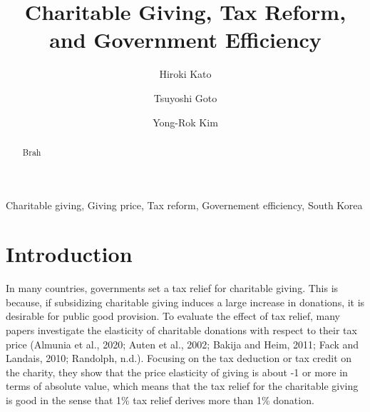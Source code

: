 \documentclass[ review  , 3p ]{elsarticle}
\begin{document}
  \begin{frontmatter}

    \title{Charitable Giving, Tax Reform, and Government Efficiency}
                \author[Osaka University]{
      Hiroki Kato 
       \corref{*} }
        \author[Chiba University]{
      Tsuyoshi Goto 
      }
        \author[Kobe University]{
      Yong-Rok Kim 
      }
            \address[Osaka University]{Graduate School of Economics, Osaka University, Japan}
        \address[Chiba University]{Graduate School of Economics, Chiba University, Japan}
        \address[Kobe University]{Graduate School of Economics, Kobe University, Japan}
      
        \begin{abstract}
      Brah
    \end{abstract}
      
        \begin{keyword}
      Charitable giving, Giving price, Tax reform, Governement efficiency, South Korea
    \end{keyword}
    
  \end{frontmatter}

  \hypertarget{introduction}{%
  \section{Introduction}\label{introduction}}
  
  In many countries, governments set a tax relief for charitable giving. This is because, if subsidizing charitable giving induces a large increase in donations, it is desirable for public good provision. To evaluate the effect of tax relief, many papers investigate the elasticity of charitable donations with respect to their tax price (Almunia et al., 2020; Auten et al., 2002; Bakija and Heim, 2011; Fack and Landais, 2010; Randolph, n.d.). Focusing on the tax deduction or tax credit on the charity, they show that the price elasticity of giving is about -1 or more in terms of absolute value, which means that the tax relief for the charitable giving is good in the sense that 1\% tax relief derives more than 1\% donation.
  
\end{document}
